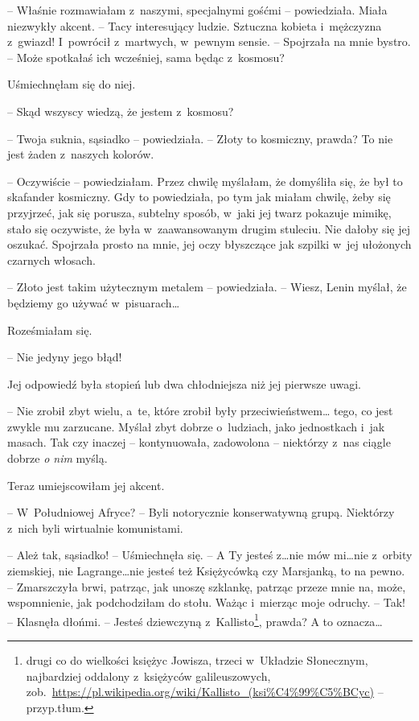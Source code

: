 \documentclass[oneside,polish,11pt,sfheadings]{mwbk}
\begin{document}
-- Właśnie rozmawiałam z~naszymi, specjalnymi gośćmi -- powiedziała. Miała
niezwykły akcent. -- Tacy interesujący ludzie. Sztuczna kobieta i~mężczyzna z~gwiazd! I~powrócił z~martwych, w~pewnym sensie. -- Spojrzała
na mnie bystro. -- Może spotkałaś ich wcześniej, sama będąc z~kosmosu?

Uśmiechnęłam się do niej. 

-- Skąd wszyscy wiedzą, że jestem z~kosmosu?

-- Twoja suknia, sąsiadko -- powiedziała. -- Złoty to kosmiczny, prawda? To
nie jest żaden z~naszych kolorów.

-- Oczywiście -- powiedziałam. Przez chwilę myślałam, że domyśliła się, że
był to skafander kosmiczny. Gdy to powiedziała, po tym jak miałam
chwilę, żeby się przyjrzeć, jak się porusza, subtelny sposób, w~jaki jej
twarz pokazuje mimikę, stało się oczywiste, że była w~zaawansowanym
drugim stuleciu. Nie dałoby się jej oszukać. Spojrzała prosto na mnie,
jej oczy błyszczące jak szpilki w~jej ułożonych czarnych włosach.

-- Złoto jest takim użytecznym metalem -- powiedziała. -- Wiesz, Lenin
myślał, że będziemy go używać w~pisuarach\ldots 

Roześmiałam się. 

-- Nie jedyny jego błąd!

Jej odpowiedź była stopień lub dwa chłodniejsza niż jej pierwsze uwagi.

-- Nie zrobił zbyt wielu, a~te, które zrobił były przeciwieństwem\ldots 
tego, co jest zwykle mu zarzucane. Myślał zbyt dobrze o~ludziach, jako
jednostkach i~jak masach. Tak czy inaczej -- kontynuowała, zadowolona -- niektórzy z~nas ciągle dobrze \textit{o nim} myślą.

Teraz umiejscowiłam jej akcent. 

-- W~Południowej Afryce? -- Byli
notorycznie konserwatywną grupą. Niektórzy z~nich byli wirtualnie
komunistami.

-- Ależ tak, sąsiadko! -- Uśmiechnęła się. -- A Ty jesteś z\ldots  nie mów
mi\ldots  nie z~orbity ziemskiej, nie Lagrange\ldots  nie jesteś też Księżycówką
czy Marsjanką, to na pewno. -- Zmarszczyła brwi, patrząc, jak unoszę
szklankę, patrząc przeze mnie na, może, wspomnienie, jak podchodziłam do
stołu. Ważąc i~mierząc moje odruchy. -- Tak! -- Klasnęła dłońmi. -- Jesteś
dziewczyną z~Kallisto\footnote{drugi co do wielkości księżyc Jowisza, trzeci w~Układzie Słonecznym, najbardziej oddalony z~księżyców galileuszowych,
zob.~\url{https://pl.wikipedia.org/wiki/Kallisto\_(ksi\%C4\%99\%C5\%BCyc)}
-- przyp.tłum.}, prawda? A to oznacza\ldots 
\end{document}

